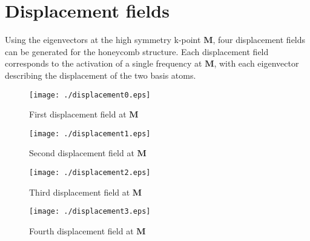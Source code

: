 \documentclass[12pt, fleqn]{article}
\begin{document}
\section{Displacement fields}
Using the eigenvectors at the high symmetry k-point $\mathbf{M}$, four displacement fields can be generated for the honeycomb structure.
Each displacement field corresponds to the activation of a single frequency at $\mathbf{M}$, with each eigenvector describing the displacement of the two basis atoms.

\begin{figure}[h]
    \begin{center}
        \texttt{[image: ./displacement0.eps]}
    \end{center}
    \caption{First displacement field at $\mathbf{M}$}
    \label{fig:disp0}
\end{figure}

\begin{figure}[h]
    \begin{center}
        \texttt{[image: ./displacement1.eps]}
    \end{center}
    \caption{Second displacement field at $\mathbf{M}$}
    \label{fig:disp1}
\end{figure}

\begin{figure}[h]
    \begin{center}
        \texttt{[image: ./displacement2.eps]}
    \end{center}
    \caption{Third displacement field at $\mathbf{M}$}
    \label{fig:disp1}
\end{figure}

\begin{figure}[h]
    \begin{center}
        \texttt{[image: ./displacement3.eps]}
    \end{center}
    \caption{Fourth displacement field at $\mathbf{M}$}
    \label{fig:disp1}
\end{figure}
\end{document}
